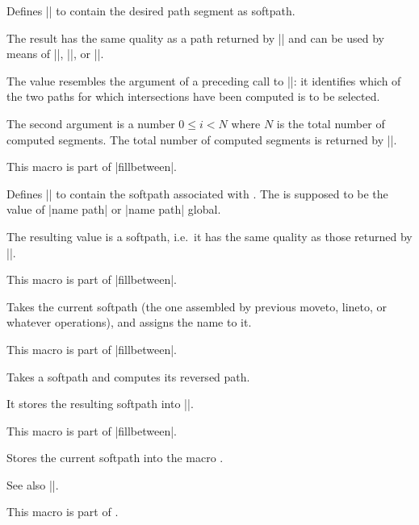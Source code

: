 \begin{command}{\pgfgetintersectionsegmentpath{}}
	Defines |\pgfretval| to contain the desired path segment as softpath.

	The result has the same quality as a path returned by |\pgfgetpath| and can be used by means of |\pgfsetpath|, |\pgfsetpathandBB|, or |\pgfaddpathandBB|.

	The value  resembles the argument of a preceding call to |\pgfcomputeintersectionsegments|: it identifies which of the two paths for which intersections have been computed is to be selected.

	The second argument  is a number $0 \le i < N$ where $N$ is the total number of computed segments. The total number of computed segments is returned by |\pgfcomputeintersectionsegments|.

	This macro is part of |fillbetween|.
\end{command}

\begin{command}{\tikzgetnamedpath{}}
	Defines |\pgfretval| to contain the softpath associated with . The  is supposed to be the value of |name path| or |name path| global.

	The resulting value is a softpath, i.e.\ it has the same quality as those returned by |\pgfgetpath|.

	This macro is part of |fillbetween|.
\end{command}

\begin{command}{\tikznamecurrentpath{}}
	Takes the current softpath (the one assembled by previous moveto, lineto, or whatever operations), and assigns the name  to it.
	
	This macro is part of |fillbetween|.
\end{command}

\begin{command}{\pgfcomputereversepath{}}
	Takes a softpath  and computes its reversed path.

	It stores the resulting softpath into |\pgfretval|.

	This macro is part of |fillbetween|.
\end{command}

\begin{command}{\pgfgetpath{}}
	Stores the current softpath into the macro .

	See also |\tikzgetnamedpath|.

	This macro is part of \pgfname.
\end{command}

